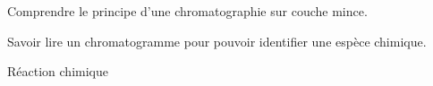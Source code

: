 \teteSndChim

\vspace*{-40pt}

\begin{objectifs}
  \item Comprendre le principe d'une chromatographie sur couche mince.
  \item Savoir lire un chromatogramme pour pouvoir identifier une espèce chimique.
\end{objectifs}

\begin{contexte}
  
  \problematique{
  }
\end{contexte}


\begin{doc}{Réaction chimique}
  \vspace*{-22pt}
  \begin{encart}

  \end{encart}

\end{doc}


